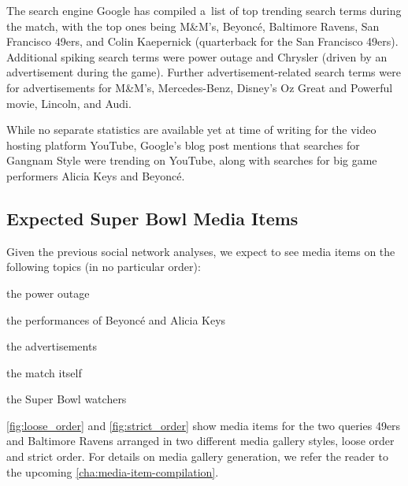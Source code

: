The search engine Google has compiled a~list of top trending search terms
during the match, with the top ones being M\&M's, Beyoncé, Baltimore Ravens,
San Francisco 49ers, and Colin Kaepernick (quarterback for the San Francisco 49ers).
Additional spiking search terms were power outage
and Chrysler (driven by an advertisement during the game).
Further advertisement-related search terms were for advertisements for M\&M's,
Mercedes-Benz, Disney’s Oz Great and Powerful movie, Lincoln, and Audi.

While no separate statistics are available yet at time of writing
for the video hosting platform YouTube,
Google's blog post mentions that searches for Gangnam Style were trending on YouTube,
along with searches for big game performers Alicia Keys and Beyoncé.

\subsection{Expected Super Bowl Media Items}

Given the previous social network analyses, we expect to see media items
on the following topics (in no particular order):

\begin{small_itemize}
  \item[] the power outage
  \item[] the performances of Beyoncé and Alicia Keys
  \item[] the advertisements
  \item[] the match itself
  \item[] the Super Bowl watchers  
\end{small_itemize}

\autoref{fig:loose_order} and \autoref{fig:strict_order} show media items
for the two queries 49ers and Baltimore Ravens arranged
in two different media gallery styles, loose order and strict order.
For details on media gallery generation, we refer the reader to the upcoming
\autoref{cha:media-item-compilation}.

